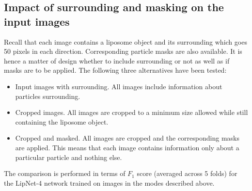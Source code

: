 \documentclass[a4paper, 11pt, table]{article}
\begin{document}
%


\subsection{Impact of surrounding and masking on the input images}

Recall that each image contains a liposome object and its surrounding which goes 50 pixels in each direction. Corresponding particle masks are also available. It is hence a matter of design whether to include surrounding or not  as well as if masks are to be applied. The following three alternatives have been tested:
\begin{itemize}
\item Input images with surrounding. All images include information about particles surrounding.

\item Cropped images. All images are cropped to a minimum size allowed while still containing the liposome object.

\item Cropped and masked. All images are cropped and the corresponding masks are applied. This means that each image contains information only about a particular particle and nothing else.
\end{itemize}

The comparison is performed in terms of $F_1$ score (averaged across 5 folds) for the LipNet-4 network trained on images in the modes described above.
\end{document}
